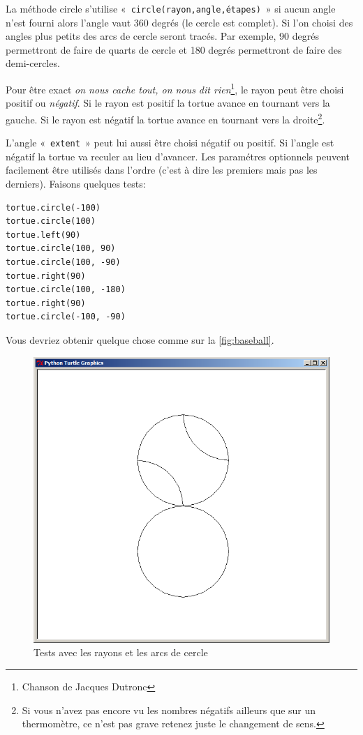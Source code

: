 La méthode circle s'utilise «~\texttt{circle(rayon,angle,étapes)}~» si aucun angle n'est fourni alors l'angle vaut 360 degrés (le cercle est complet). Si l'on choisi des angles plus petits des arcs de cercle seront tracés. Par exemple, 90 degrés permettront de faire de quarts de cercle et 180 degrés permettront de faire des demi-cercles.

Pour être exact \emph{on nous cache tout, on nous dit rien}\footnote{Chanson de Jacques Dutronc}, le rayon peut être choisi positif ou \emph{négatif}. Si le rayon est positif la tortue avance en tournant vers la gauche. Si le rayon est négatif la tortue avance en tournant vers la droite\footnote{Si vous n'avez pas encore vu les nombres négatifs ailleurs que sur un thermomètre, ce n'est pas grave retenez juste le changement de sens.}.

L'angle «~\texttt{extent}~» peut lui aussi être choisi négatif ou positif. Si l'angle est négatif la tortue va reculer au lieu d'avancer. Les paramétres optionnels peuvent facilement être utilisés dans l'ordre (c'est à dire les premiers mais pas les derniers). Faisons quelques tests:

\begin{Verbatim}[frame=single,rulecolor=\color{mbleu}, label=à taper]
tortue.circle(-100)
tortue.circle(100)
tortue.left(90)
tortue.circle(100, 90)
tortue.circle(100, -90)
tortue.right(90)
tortue.circle(100, -180)
tortue.right(90)
tortue.circle(-100, -90)
\end{Verbatim}

Vous devriez obtenir quelque chose comme sur la \autoref{fig:baseball}.

\begin{figure}[h!]
\centering
\includegraphics[scale=0.4]{images/baseball}
\caption{Tests avec les rayons et les arcs de cercle}\label{fig:baseball}
\end{figure}

